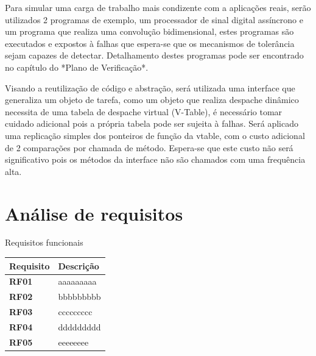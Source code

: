 Para simular uma carga de trabalho mais condizente com a aplicações reais, serão utilizados 2 programas de exemplo, um processador de sinal digital assíncrono e um programa que realiza uma convolução bidimensional, estes programas são executados e expostos à falhas que espera-se que os mecanismos de tolerância sejam capazes de detectar. Detalhamento destes programas pode ser encontrado no capítulo do *Plano de Verificação*.

Visando a reutilização de código e abstração, será utilizada uma interface que generaliza um objeto de tarefa, como um objeto que realiza despache dinâmico necessita de uma tabela de despache virtual (V-Table), é necessário tomar cuidado adicional pois a própria tabela pode ser sujeita à falhas. Será aplicado uma replicação simples dos ponteiros de função da vtable, com o custo adicional de 2 comparações por chamada de método. Espera-se que este custo não será significativo pois os métodos da interface não são chamados com uma frequência alta.


\section{Análise de requisitos}
\label{sec:req}

\begin{quadro}[H]
    \centering
    \caption{Requisitos funcionais}
    \begin{tabular}{|p{}|p{}|}
        \hline
        \rowcolor[HTML]{C0C0C0}
        \textbf{Requisito} & \textbf{Descrição}  \\
        \hline
        
        \textbf{RF01} & aaaaaaaaa \\ 
        \hline

        \textbf{RF02} & bbbbbbbbb \\
        \hline
        
        \textbf{RF03} & ccccccccc \\
        \hline
        
        \textbf{RF04} & ddddddddd \\
        \hline
        
        \textbf{RF05} & eeeeeeee \\
        \hline
    \end{tabular}
    \label{tab:rf}
\end{quadro}

